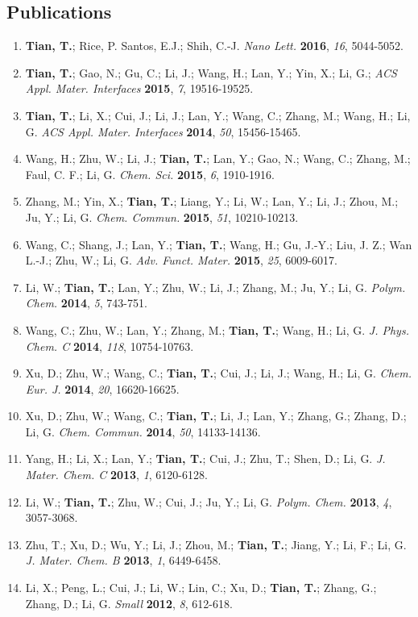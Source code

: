 \documentclass[margin]{res}
\begin{document}
\begin{resume}
\section{Publications}
\begin{enumerate}
  \item \textbf{Tian, T.}; Rice, P. Santos, E.J.; Shih, C.-J. \textit{Nano Lett.} \textbf{2016}, \textit{16}, 5044-5052.
  \item \textbf{Tian, T.}; Gao, N.; Gu, C.; Li, J.; Wang, H.; Lan, Y.; Yin, X.; Li, G.; \textit{ACS Appl. Mater. Interfaces} \textbf{2015}, \textit{7}, 19516-19525.
  \item \textbf{Tian, T.}; Li, X.; Cui, J.; Li, J.; Lan, Y.; Wang, C.; Zhang, M.; Wang, H.; Li, G. \textit{ACS Appl. Mater. Interfaces} \textbf{2014}, \textit{50}, 15456-15465.
  \item Wang, H.; Zhu, W.; Li, J.; \textbf{Tian, T.}; Lan, Y.; Gao, N.; Wang, C.; Zhang, M.; Faul, C. F.; Li, G. \textit{Chem. Sci.} \textbf{2015}, \textit{6}, 1910-1916.
  \item Zhang, M.; Yin, X.; \textbf{Tian, T.}; Liang, Y.; Li, W.; Lan, Y.; Li, J.; Zhou, M.; Ju, Y.; Li, G. \textit{Chem. Commun.} \textbf{2015}, \textit{51}, 10210-10213.
  \item Wang, C.; Shang, J.; Lan, Y.; \textbf{Tian, T.}; Wang, H.; Gu, J.-Y.; Liu, J. Z.; Wan L.-J.; Zhu, W.; Li, G. \textit{Adv. Funct. Mater.} \textbf{2015}, \textit{25}, 6009-6017.
  \item Li, W.; \textbf{Tian, T.}; Lan, Y.; Zhu, W.; Li, J.; Zhang, M.; Ju, Y.; Li, G. \textit{Polym. Chem.} \textbf{2014}, \textit{5}, 743-751.
  \item Wang, C.; Zhu, W.; Lan, Y.; Zhang, M.; \textbf{Tian, T.}; Wang, H.; Li, G. \textit{J. Phys. Chem. C} \textbf{2014}, \textit{118}, 10754-10763.
  \item Xu, D.; Zhu, W.; Wang, C.; \textbf{Tian, T.}; Cui, J.; Li, J.; Wang, H.; Li, G. \textit{Chem. Eur. J.} \textbf{2014}, \textit{20}, 16620-16625.
  \item Xu, D.; Zhu, W.; Wang, C.; \textbf{Tian, T.}; Li, J.; Lan, Y.; Zhang, G.; Zhang, D.; Li, G. \textit{Chem. Commun.} \textbf{2014}, \textit{50}, 14133-14136.
  \item Yang, H.; Li, X.; Lan, Y.; \textbf{Tian, T.}; Cui, J.; Zhu, T.; Shen, D.; Li, G. \textit{J. Mater. Chem. C} \textbf{2013}, \textit{1}, 6120-6128.
  \item Li, W.; \textbf{Tian, T.}; Zhu, W.; Cui, J.; Ju, Y.; Li, G. \textit{Polym. Chem.} \textbf{2013}, \textit{4}, 3057-3068.
  \item Zhu, T.; Xu, D.; Wu, Y.; Li, J.; Zhou, M.; \textbf{Tian, T.}; Jiang, Y.; Li, F.; Li, G. \textit{J. Mater. Chem. B} \textbf{2013}, \textit{1}, 6449-6458.
  \item Li, X.; Peng, L.; Cui, J.; Li, W.; Lin, C.; Xu, D.; \textbf{Tian, T.}; Zhang, G.; Zhang, D.; Li, G. \textit{Small} \textbf{2012}, \textit{8}, 612-618.


\end{enumerate}



\end{resume}
\end{document}
